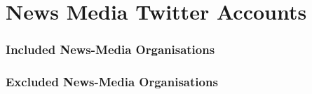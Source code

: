 \chapter{News Media Twitter Accounts\label{app:accounts}}

\subsection{Included News-Media Organisations}

\begin{table}[h]
	\caption{}
	\label{appendix:tab:accounts_0}
	\begin{center}
		\resizebox{1 \textwidth}{!}{}
	\end{center}
\end{table}

\begin{table}[h]
	\caption{}
	\label{appendix:tab:accounts_1}
\begin{center}
\resizebox{1 \textwidth}{!}{}
\end{center}
\end{table}

\begin{table}[h]
	\caption{}
	\label{appendix:tab:accounts_2}
	\begin{center}
		\resizebox{1 \textwidth}{!}{}
	\end{center}
\end{table}

\begin{table}[h]
	\caption{}
	\label{appendix:tab:accounts_3}
	\begin{center}
		\resizebox{1 \textwidth}{!}{}
	\end{center}
\end{table}


\newpage

\subsection{Excluded News-Media Organisations}

\begin{table}[h]
	\caption{}
	\label{appendix:tab:removed_accounts_0}
	\begin{center}
		\resizebox{1 \textwidth}{!}{}
	\end{center}
\end{table}

